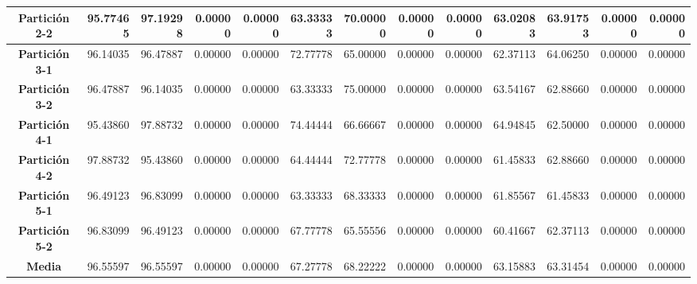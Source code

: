 \documentclass[a4paper,11pt]{article}
\begin{document}
\begin{table}[H]
\begin{adjustbox}{width=1.1\textwidth}
\begin{tabular}{|c|r|r|r|r|r|r|r|r|r|r|r|r|}
    \textbf{Partición 2-2} & 95.77465 & 97.19298 & 0.00000 & 0.00000 & 63.33333 & 70.00000 & 0.00000 & 0.00000 & 63.02083 & 63.91753 & 0.00000 & 0.00000 \\ \hline
    \textbf{Partición 3-1} & 96.14035 & 96.47887 & 0.00000 & 0.00000 & 72.77778 & 65.00000 & 0.00000 & 0.00000 & 62.37113 & 64.06250 & 0.00000 & 0.00000 \\ \hline
    \textbf{Partición 3-2} & 96.47887 & 96.14035 & 0.00000 & 0.00000 & 63.33333 & 75.00000 & 0.00000 & 0.00000 & 63.54167 & 62.88660 & 0.00000 & 0.00000 \\ \hline
    \textbf{Partición 4-1} & 95.43860 & 97.88732 & 0.00000 & 0.00000 & 74.44444 & 66.66667 & 0.00000 & 0.00000 & 64.94845 & 62.50000 & 0.00000 & 0.00000 \\ \hline
    \textbf{Partición 4-2} & 97.88732 & 95.43860 & 0.00000 & 0.00000 & 64.44444 & 72.77778 & 0.00000 & 0.00000 & 61.45833 & 62.88660 & 0.00000 & 0.00000 \\ \hline
    \textbf{Partición 5-1} & 96.49123 & 96.83099 & 0.00000 & 0.00000 & 63.33333 & 68.33333 & 0.00000 & 0.00000 & 61.85567 & 61.45833 & 0.00000 & 0.00000 \\ \hline
    \textbf{Partición 5-2} & 96.83099 & 96.49123 & 0.00000 & 0.00000 & 67.77778 & 65.55556 & 0.00000 & 0.00000 & 60.41667 & 62.37113 & 0.00000 & 0.00000 \\ \hline
    \textbf{Media} & 96.55597 & 96.55597 & 0.00000 & 0.00000 & 67.27778 & 68.22222 & 0.00000 & 0.00000 & 63.15883 & 63.31454 & 0.00000 & 0.00000 \\ \hline
    \end{tabular}
    \end{adjustbox}
    \label{NN3}
  \end{table}
  
\end{document}
